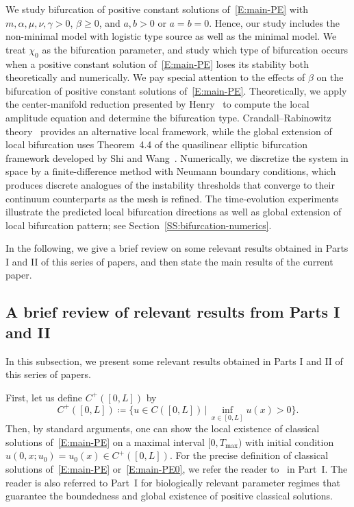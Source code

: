 \documentclass[11pt]{article} %
\theoremstyle{remark}
\theoremstyle{remark}
\numberwithin{equation}{section}
\numberwithin{figure}{section}
\numberwithin{table}{section}
\begin{document}
We study bifurcation of positive constant solutions of~\eqref{E:main-PE} with
$m, \alpha, \mu, \nu, \gamma > 0$, $\beta \ge 0$, and $a, b > 0$ or $a = b = 0$.
Hence, our study includes the non-minimal model with logistic type source as
well as the minimal model. We treat $\chi_0$ as the bifurcation parameter, and
study which type of bifurcation occurs when a positive constant solution
of~\eqref{E:main-PE} loses its stability both theoretically and numerically. We
pay special attention to the effects of $\beta$ on the bifurcation of positive
constant solutions of~\eqref{E:main-PE}. Theoretically, we apply the
center-manifold reduction presented by
Henry~\cite[Chapter~6]{henry:81:geometric} to compute the local amplitude
equation and determine the bifurcation type. Crandall--Rabinowitz
theory~\cite{crandall.rabinowitz:71:bifurcation} provides an alternative local
framework, while the global extension of local bifurcation uses Theorem~4.4 of
the quasilinear elliptic bifurcation framework developed by Shi and
Wang~\cite{shi.wang:09:on}. Numerically, we discretize the system in space by a
finite-difference method with Neumann boundary conditions, which produces
discrete analogues of the instability thresholds that converge to their
continuum counterparts as the mesh is refined. The time-evolution experiments
illustrate the predicted local bifurcation directions as well as global
extension of local bifurcation pattern; see
Section~\ref{SS:bifurcation-numerics}.

In the following, we give a brief review on some relevant results obtained in
Parts I and II of this series of papers, and then state the main results of the
current paper.


\subsection{A brief review of relevant results from Parts I and II}


In this subsection, we present some relevant results obtained in Parts I and II
of this series of papers.

\smallskip

First, let us define $C^+([0, L])$ by
\[
  C^+([0,L])\coloneq\{u\in C([0,L])\,|\, \inf_{x\in [0,L]} u(x)>0\}.
\]
Then, by standard arguments, one can show the local existence of classical
solutions of~\eqref{E:main-PE} on a maximal interval $[0, T_{\max})$ with initial
condition $u(0, x;u_0) = u_0(x) \in C^+([0, L])$. For the precise definition of
classical solutions of~\eqref{E:main-PE} or~\eqref{E:main-PE0}, we refer the
reader to~\cite[Definition 1.1]{chen.ruau.ea:26:chemotaxis*1} in Part~I. The
reader is also referred to Part~I \cite{chen.ruau.ea:26:chemotaxis*1} for
biologically relevant parameter regimes that guarantee the boundedness and
global existence of positive classical solutions.
\end{document}
